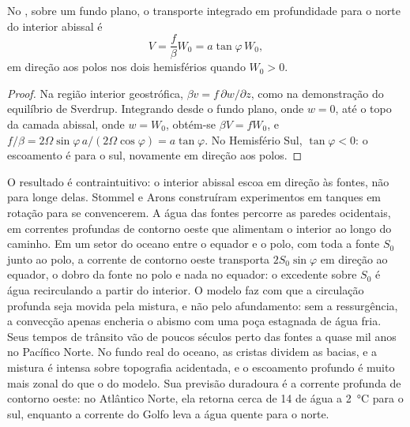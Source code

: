 \begin{proposition}\label{prop:b3:ocean-dynamics:abyssal}
No , sobre um fundo plano, o transporte integrado em profundidade
para o norte do interior abissal é
\[
V = \frac{f}{\beta}W_0 = a\tan\varphi\,W_0 ,
\]
em direção aos polos nos dois hemisférios quando $W_0 > 0$.
\end{proposition}

\begin{proof}
Na região interior geostrófica, $\beta v = f\,\partial w/\partial z$, como na
demonstração do equilíbrio de Sverdrup. Integrando desde o fundo plano, onde
$w = 0$, até o topo da camada abissal, onde $w = W_0$, obtém-se $\beta V =
fW_0$, e $f/\beta = 2\Omega\sin\varphi\,a/(2\Omega\cos\varphi) =
a\tan\varphi$. No Hemisfério Sul, $\tan\varphi < 0$: o escoamento é
para o sul, novamente em direção aos polos.
\end{proof}

O resultado é contraintuitivo: o interior abissal escoa em direção às
fontes, não para longe delas. Stommel e Arons construíram experimentos em tanques em rotação
para se convencerem. A água das fontes percorre
as paredes ocidentais, em correntes profundas de contorno oeste que alimentam o interior
ao longo do caminho. Em um setor do oceano entre o equador e o polo, com toda a fonte $S_0$
junto ao polo, a corrente de contorno oeste
transporta $2S_0\sin\varphi$ em direção ao equador, o dobro da fonte no polo
e nada no equador: o excedente sobre $S_0$ é água recirculando
a partir do interior. O modelo faz com que a circulação profunda seja movida pela mistura,
e não pelo afundamento: sem a ressurgência, a convecção apenas encheria o
abismo com uma poça estagnada de água fria. Seus tempos de trânsito vão de
poucos séculos perto das fontes a quase mil anos no Pacífico
Norte. No fundo real do oceano, as cristas dividem as bacias, e a mistura é
intensa sobre topografia acidentada, e o escoamento profundo é muito mais zonal do que o
do modelo. Sua previsão duradoura é a corrente profunda de contorno oeste: no
Atlântico Norte, ela retorna cerca de \qty{14}{\sverdrup} de água a
\qty{2}{\celsius} para o sul, enquanto a corrente do Golfo leva a
água quente para o norte.


